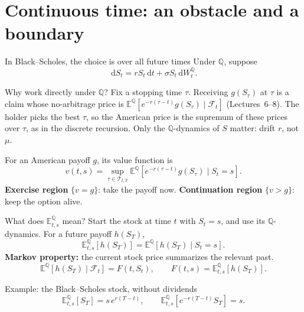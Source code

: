 \documentclass[handout,10pt,aspectratio=169]{beamer}
\newcommand{\E}{\mathbb E}
\newcommand{\Q}{\mathbb Q}
\newcommand{\cF}{\mathcal F}
\newcommand{\dd}{\,\mathrm d}
\begin{document}
\section{Continuous time: an obstacle and a boundary}

\begin{frame}{In Black--Scholes, the choice is over all future times}
\small
Under \(\Q\), suppose
\[
\dd S_t=rS_t\dd t+\sigma S_t\dd W_t^{\Q}.
\]
\begin{block}{Why work directly under \(\Q\)?}
Fix a stopping time \(\tau\). Receiving \(g(S_\tau)\) at \(\tau\) is a claim
whose no-arbitrage price is \(\E^\Q[e^{-r(\tau-t)}g(S_\tau)\mid\cF_t]\)
(Lectures~6--8). The holder picks the best \(\tau\), so the American price is
the supremum of these prices over \(\tau\), as in the discrete recursion.
Only the \(\Q\)-dynamics of \(S\) matter: drift \(r\), not \(\mu\).
\end{block}
For an American payoff \(g\), its value function is
\[
\boxed{v(t,s)=\sup_{\tau\in\mathcal T_{t,T}}
\E^\Q\!\left[e^{-r(\tau-t)}g(S_\tau)\mid S_t=s\right].}
\]
\textbf{Exercise region} \(\{v=g\}\): take the payoff now.\quad
\textbf{Continuation region} \(\{v>g\}\): keep the option alive.
\end{frame}

\begin{frame}{What does \(\E^\Q_{t,s}\) mean?}
\small
Start the stock at time \(t\) with \(S_t=s\), and use its \(\Q\)-dynamics.
For a future payoff \(h(S_T)\),
\[
\boxed{\E^\Q_{t,s}[h(S_T)]
=\E^\Q[h(S_T)\mid S_t=s].}
\]
\textbf{Markov property:} the current stock price summarizes the relevant past.
\[
\E^\Q[h(S_T)\mid\cF_t]=F(t,S_t),\qquad
F(t,s)=\E^\Q_{t,s}[h(S_T)].
\]
\begin{exampleblock}{Example: the Black--Scholes stock, without dividends}
\[
\E^\Q_{t,s}[S_T]=s\,e^{r(T-t)},\qquad
\E^\Q_{t,s}[e^{-r(T-t)}S_T]=s.
\]
\end{exampleblock}
\end{frame}
\end{document}
